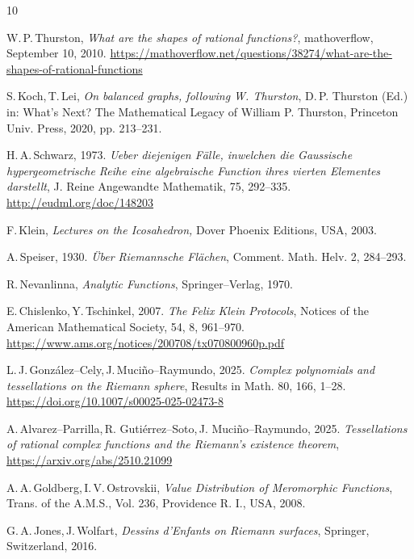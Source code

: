 \documentclass[final,3p,times]{elsarticle}
\theoremstyle{definition}
\begin{document}
\begin{thebibliography}{10}

W.\,P.\,Thurston,
\emph{What are the shapes of rational functions?}, mathoverflow, 
September 10, 2010.
\url{https://mathoverflow.net/questions/38274/what-are-the-shapes-of-rational-functions}

S.\,Koch,\,T.\,Lei, 
\emph{On balanced graphs, following W. Thurston},
D.\,P. Thurston (Ed.)
in: 
What's Next? The Mathematical Legacy of William P. Thurston,  
Princeton Univ. Press, 
2020, 
pp. 213--231. 

H.\,A.\,Schwarz, 
1973.
\emph{Ueber diejenigen F\"alle, inwelchen die Gaussische 
hypergeometrische Reihe eine algebraische Function ihres 
vierten Elementes darstellt},
J. Reine Angewandte Mathematik,
75, 
292--335.
\url{http://eudml.org/doc/148203}

F.\,Klein, 
\emph{Lectures on the Icosahedron,}
Dover Phoenix Editions, USA, 
2003. 

A.\,Speiser, 
1930.
\emph{\"Uber Riemannsche Fl\"achen},
Comment. Math. Helv. 
2, 
284--293.

R.\,Nevanlinna,  
\emph{Analytic Functions}, 
Springer--Verlag, 
1970.

E.\,Chislenko,\,Y.\,Tschinkel, 
2007. 
{\it The Felix Klein Protocols},
Notices of the American Mathematical Society,
54, 8,
961--970.
\url{https://www.ams.org/notices/200708/tx070800960p.pdf}

L.\,J.\,Gonz\'alez--Cely,\,J.\,Muci\~no--Raymundo,
2025.
\emph{Complex polynomials and tessellations on the 
Riemann sphere},
Results in Math. 
80, 166, 1--28. 
\url{https://doi.org/10.1007/s00025-025-02473-8}

A.\,Alvarez--Parrilla,\,R. Guti\'errez--Soto,\,J. Muci\~no--Raymundo,
2025.
\emph{Tessellations of rational complex functions and the Riemann's existence theorem},
\url{https://arxiv.org/abs/2510.21099}

A.\,A.\,Goldberg,\,I.\,V.\,Ostrovskii,
\emph{Value Distribution of Meromorphic Functions},
Trans. of the A.M.S., Vol. 236, 
Providence R. I., USA,
2008.

G.\,A.\,Jones,\,J.\,Wolfart,
\emph{Dessins d'Enfants on Riemann surfaces},
Springer,
Switzerland,
2016.


\end{thebibliography}
\end{document}
